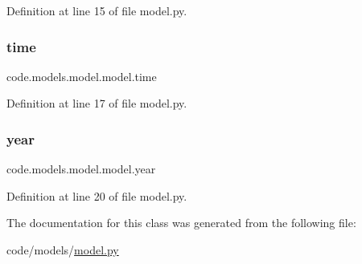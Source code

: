 Definition at line 15 of file model.\+py.

\mbox{\label{classcode_1_1models_1_1model_1_1model_ad6a5095c00c3d7cf0d61d3f028db0ce0}} 
\subsubsection{\texorpdfstring{time}{time}}
{\footnotesize\ttfamily code.\+models.\+model.\+model.\+time}



Definition at line 17 of file model.\+py.

\mbox{\label{classcode_1_1models_1_1model_1_1model_ac9619b942cec2ddaa57336fbb3805d21}} 
\subsubsection{\texorpdfstring{year}{year}}
{\footnotesize\ttfamily code.\+models.\+model.\+model.\+year}



Definition at line 20 of file model.\+py.



The documentation for this class was generated from the following file\+:\begin{DoxyCompactItemize}
\item 
code/models/\hyperlink{model_8py}{model.\+py}\end{DoxyCompactItemize}
